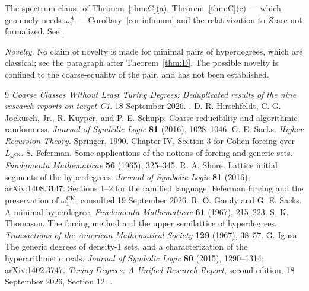 \documentclass[11pt,letterpaper]{article}
\theoremstyle{definition}
\numberwithin{equation}{section}
\newcommand{\omck}{\omega_1^{\mathrm{CK}}}
\begin{document}
The spectrum clause of Theorem~\ref{thm:C}(a), Theorem~\ref{thm:C}(c) --- which genuinely needs $\omega_1^A$ --- Corollary~\ref{cor:infimum} and the relativization to $Z$ are not formalized. See .

\emph{Novelty.} No claim of novelty is made for minimal pairs of hyperdegrees, which are classical; see the paragraph after Theorem~\ref{thm:D}. The possible novelty is confined to the coarse-equality of the pair, and has not been established.

\begingroup\raggedright\small
\begin{thebibliography}{9}
\emph{Coarse Classes Without Least Turing Degrees: Deduplicated results of the nine research reports on target C1}. 18 September 2026. .
D. R. Hirschfeldt, C. G. Jockusch, Jr., R. Kuyper, and P. E. Schupp. Coarse reducibility and algorithmic randomness. \emph{Journal of Symbolic Logic} \textbf{81} (2016), 1028--1046.
G. E. Sacks. \emph{Higher Recursion Theory}. Springer, 1990. Chapter IV, Section 3 for Cohen forcing over $L_{\omck}$.
S. Feferman. Some applications of the notions of forcing and generic sets. \emph{Fundamenta Mathematicae} \textbf{56} (1965), 325--345.
R. A. Shore. Lattice initial segments of the hyperdegrees. \emph{Journal of Symbolic Logic} \textbf{81} (2016); arXiv:1408.3147. Sections 1--2 for the ramified language, Feferman forcing and the preservation of $\omck$; consulted 19 September 2026.
R. O. Gandy and G. E. Sacks. A minimal hyperdegree. \emph{Fundamenta Mathematicae} \textbf{61} (1967), 215--223.
S. K. Thomason. The forcing method and the upper semilattice of hyperdegrees. \emph{Transactions of the American Mathematical Society} \textbf{129} (1967), 38--57.
G. Igusa. The generic degrees of density-1 sets, and a characterization of the hyperarithmetic reals. \emph{Journal of Symbolic Logic} \textbf{80} (2015), 1290--1314; arXiv:1402.3747.
\emph{Turing Degrees: A Unified Research Report}, second edition, 18 September 2026, Section 12. .
\end{thebibliography}
\endgroup
\end{document}
